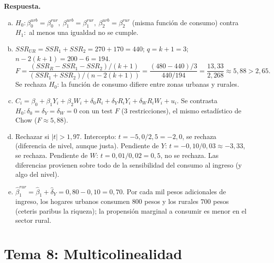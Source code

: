 \documentclass[12pt,letterpaper]{article}
\newenvironment{resp}{\begingroup\color{blue}\par\noindent\textbf{Respuesta.}\ }{\par\endgroup}
\newcommand{\tema}[1]{\section*{#1}}
\begin{document}
\begin{enumerate}[1.]
\begin{resp}
\begin{enumerate}[a)]
\item $H_0:\beta_0^{urb}=\beta_0^{rur},\ \beta_1^{urb}=\beta_1^{rur},\ \beta_2^{urb}=\beta_2^{rur}$ (misma función de consumo) contra $H_1:$ al menos una igualdad no se cumple.
\item $SSR_{UR}=SSR_1+SSR_2=270+170=440$; $q=k+1=3$; $n-2(k+1)=200-6=194$.
\[
F=\frac{(SSR_R-SSR_1-SSR_2)/(k+1)}{(SSR_1+SSR_2)/(n-2(k+1))}=\frac{(480-440)/3}{440/194}=\frac{13{,}33}{2{,}268}\approx5{,}88>2{,}65 .
\]
Se rechaza $H_0$: la función de consumo difiere entre zonas urbanas y rurales.
\item $C_i=\beta_0+\beta_1Y_i+\beta_2W_i+\delta_0R_i+\delta_YR_iY_i+\delta_WR_iW_i+u_i$. Se contrasta $H_0:\delta_0=\delta_Y=\delta_W=0$ con un test $F$ (3 restricciones), el mismo estadístico de Chow ($F\approx5{,}88$).
\item Rechazar si $|t|>1{,}97$. Intercepto: $t=-5{,}0/2{,}5=-2{,}0$, se rechaza (diferencia de nivel, aunque justa). Pendiente de $Y$: $t=-0{,}10/0{,}03\approx-3{,}33$, se rechaza. Pendiente de $W$: $t=0{,}01/0{,}02=0{,}5$, no se rechaza. Las diferencias provienen sobre todo de la sensibilidad del consumo al ingreso (y algo del nivel).
\item $\hat\beta_1^{rur}=\hat\beta_1+\hat\delta_Y=0{,}80-0{,}10=0{,}70$. Por cada mil pesos adicionales de ingreso, los hogares urbanos consumen $800$ pesos y los rurales $700$ pesos (ceteris paribus la riqueza); la propensión marginal a consumir es menor en el sector rural.
\end{enumerate}
\end{resp}
\end{enumerate}

\newpage
\tema{Tema 8: Multicolinealidad}
\end{document}
